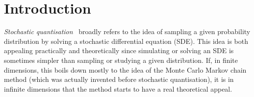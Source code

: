 \documentclass[a4paper,10pt]{article}
\newcommand{\tmtextit}[1]{{\itshape{#1}}}
\begin{document}

\section{Introduction}

\tmtextit{Stochastic
quantisation}~{\cite{damgaard_stochastic_1987,damgaard_stochastic_1988}}
broadly refers to the idea of sampling a given probability distribution by
solving a stochastic differential equation (SDE). This idea is both appealing
practically and theoretically since simulating or solving an SDE is sometimes
simpler than sampling or studying a given distribution. If, in finite
dimensions, this boils down mostly to the idea of the Monte Carlo Markov chain
method (which was actually invented before stochastic quantisation), it is in
infinite dimensions that the method starts to have a real theoretical appeal.
\end{document}
